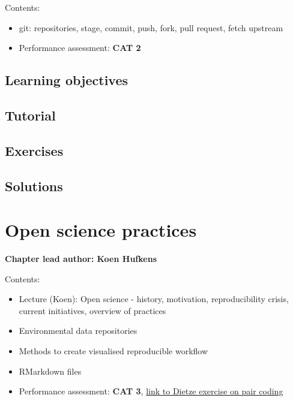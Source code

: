 \documentclass[
]{book}
\providecommand{\tightlist}{%
  \setlength{\itemsep}{0pt}\setlength{\parskip}{0pt}}
\begin{document}
Contents:

\begin{itemize}
\tightlist
\item
  git: repositories, stage, commit, push, fork, pull request, fetch upstream
\item
  Performance assessment: \textbf{CAT 2}
\end{itemize}

\hypertarget{learning-objectives-5}{%
\section{Learning objectives}\label{learning-objectives-5}}

\hypertarget{tutorial-5}{%
\section{Tutorial}\label{tutorial-5}}

\hypertarget{exercises-5}{%
\section{Exercises}\label{exercises-5}}

\hypertarget{solutions-5}{%
\section{Solutions}\label{solutions-5}}

\hypertarget{open_science}{%
\chapter{Open science practices}\label{open_science}}

\textbf{Chapter lead author: Koen Hufkens}

Contents:

\begin{itemize}
\tightlist
\item
  Lecture (Koen): Open science - history, motivation, reproducibility crisis, current initiatives, overview of practices
\item
  Environmental data repositories
\item
  Methods to create visualised reproducible workflow
\item
  RMarkdown files
\item
  Performance assessment: \textbf{CAT 3}, \href{https://github.com/stineb/EF_Activities/blob/master/Exercise_04_PairCoding.Rmd}{link to Dietze exercise on pair coding}
\end{itemize}
\end{document}

